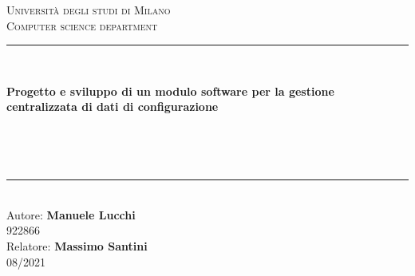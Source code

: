 \documentclass[\main/main.tex]{subfiles}
\begin{document}
\pagestyle{empty} %
\begin{titlepage}
	\begin{center}
		\vfill
		{\large \scshape Università degli studi di Milano}\\[0.1cm]
		{\large \scshape Computer science department}\\[0.5cm]
		\rule{\textwidth}{1.5pt}\\[0cm]
		{\huge \bfseries  Progetto e sviluppo di un modulo software per la gestione centralizzata di dati di configurazione \par \ }\\[-0.5cm]
		\rule{\textwidth}{1.5pt}\\[2.5cm]
		{\hfill \large Autore: \textbf{Manuele Lucchi}} \\
		\vspace{0.1cm}
		{\hfill \large 922866} \\
		\vspace{0.5cm}
		{\hfill \large Relatore: \textbf{Massimo Santini}} \\
	    \vspace{1cm}
		\hfill  08/2021
	\end{center}
\end{titlepage}
\end{document}
